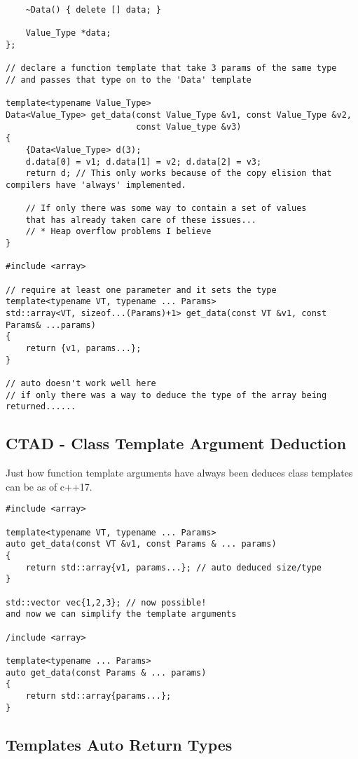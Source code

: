 \begin{verbatim}
    ~Data() { delete [] data; }

    Value_Type *data;
};

// declare a function template that take 3 params of the same type
// and passes that type on to the 'Data' template

template<typename Value_Type>
Data<Value_Type> get_data(const Value_Type &v1, const Value_Type &v2,
                          const Value_type &v3)
{
    {Data<Value_Type> d(3);
    d.data[0] = v1; d.data[1] = v2; d.data[2] = v3;
    return d; // This only works because of the copy elision that compilers have 'always' implemented.

    // If only there was some way to contain a set of values
    that has already taken care of these issues...  
    // * Heap overflow problems I believe
}

#include <array>

// require at least one parameter and it sets the type
template<typename VT, typename ... Params>
std::array<VT, sizeof...(Params)+1> get_data(const VT &v1, const Params& ...params)
{
    return {v1, params...};
}

// auto doesn't work well here
// if only there was a way to deduce the type of the array being returned......
\end{verbatim}

\subsection{CTAD - Class Template Argument Deduction}

Just how function template arguments have always been deduces class templates can be as of c++17.

\begin{verbatim}
#include <array>

template<typename VT, typename ... Params>
auto get_data(const VT &v1, const Params & ... params)
{
    return std::array{v1, params...}; // auto deduced size/type
}

std::vector vec{1,2,3}; // now possible! 
and now we can simplify the template arguments

/include <array>

template<typename ... Params>
auto get_data(const Params & ... params)
{
    return std::array{params...};
}
\end{verbatim}

\subsection{Templates Auto Return Types}

